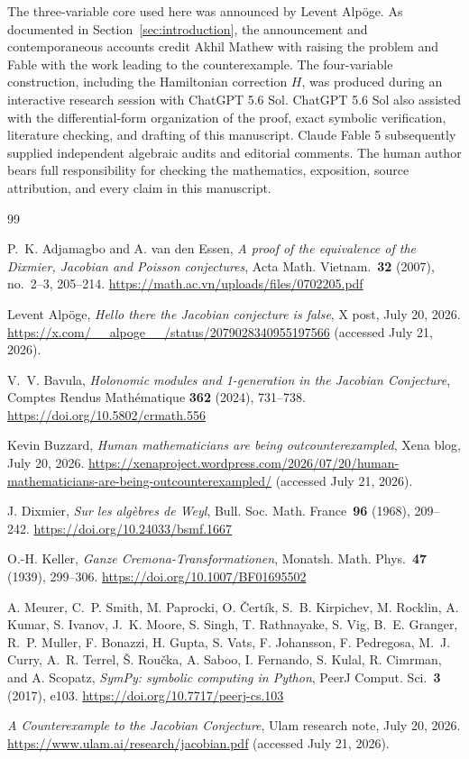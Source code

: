 \documentclass[11pt]{article}
\theoremstyle{remark}
\begin{document}
The three-variable core used here was announced by Levent Alp\"oge.  As
documented in Section~\ref{sec:introduction}, the announcement and
contemporaneous accounts credit Akhil Mathew with raising the problem and
Fable with the work leading to the counterexample.  The four-variable
construction, including the Hamiltonian correction \(H\), was produced during
an interactive research session with {ChatGPT 5.6 Sol}.  {ChatGPT 5.6 Sol}
also assisted with the differential-form organization of the proof, exact
symbolic verification, literature checking, and drafting of this manuscript.
{Claude Fable 5} subsequently supplied independent algebraic audits and
editorial comments.  The human author bears
full responsibility for checking the mathematics, exposition, source
attribution, and every claim in this manuscript.

\begin{thebibliography}{99}

P.~K. Adjamagbo and A. van den Essen,
\emph{A proof of the equivalence of the Dixmier, Jacobian and Poisson conjectures},
Acta Math. Vietnam.\ \textbf{32} (2007), no.~2--3, 205--214.
\url{https://math.ac.vn/uploads/files/0702205.pdf}

Levent Alp\"oge,
\emph{Hello there the Jacobian conjecture is false},
X post, July 20, 2026.
\url{https://x.com/__alpoge__/status/2079028340955197566}
(accessed July 21, 2026).

V.~V. Bavula,
\emph{Holonomic modules and 1-generation in the Jacobian Conjecture},
Comptes Rendus Math\'ematique \textbf{362} (2024), 731--738.
\url{https://doi.org/10.5802/crmath.556}

Kevin Buzzard,
\emph{Human mathematicians are being outcounterexampled},
Xena blog, July 20, 2026.
\url{https://xenaproject.wordpress.com/2026/07/20/human-mathematicians-are-being-outcounterexampled/}
(accessed July 21, 2026).

J. Dixmier,
\emph{Sur les alg\`ebres de Weyl},
Bull. Soc. Math. France\ \textbf{96} (1968), 209--242.
\url{https://doi.org/10.24033/bsmf.1667}

O.-H. Keller,
\emph{Ganze Cremona-Transformationen},
Monatsh. Math. Phys.\ \textbf{47} (1939), 299--306.
\url{https://doi.org/10.1007/BF01695502}

A. Meurer, C.~P. Smith, M. Paprocki, O. \v{C}ert\'ik, S.~B. Kirpichev,
M. Rocklin, A. Kumar, S. Ivanov, J.~K. Moore, S. Singh, T. Rathnayake,
S. Vig, B.~E. Granger, R.~P. Muller, F. Bonazzi, H. Gupta, S. Vats,
F. Johansson, F. Pedregosa, M.~J. Curry, A.~R. Terrel, \v{S}. Rou\v{c}ka,
A. Saboo, I. Fernando, S. Kulal, R. Cimrman, and A. Scopatz,
\emph{SymPy: symbolic computing in Python},
PeerJ Comput. Sci.\ \textbf{3} (2017), e103.
\url{https://doi.org/10.7717/peerj-cs.103}

\emph{A Counterexample to the Jacobian Conjecture},
Ulam research note, July 20, 2026.
\url{https://www.ulam.ai/research/jacobian.pdf}
(accessed July 21, 2026).

\end{thebibliography}
\end{document}
